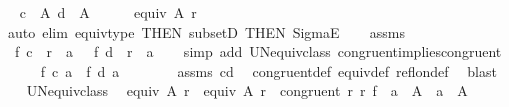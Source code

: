 \begin{isabellebody}
\ \isamarkupfalse%
\ {\isachardoublequoteopen}c\ {\isasymin}\ A{}{\isachardoublequoteclose}\ {\isachardoublequoteopen}d\ {\isasymin}\ A{}{\isachardoublequoteclose}\isanewline
\ \ \ \ \isamarkupfalse%
\ {\isacartoucheopen}equiv\ A{}\ r{}{\isacartoucheclose}\ \isamarkupfalse%
\ {\isacharparenleft}{\kern0pt}auto\ elim{\isacharbang}{\kern0pt}{\isacharcolon}{\kern0pt}\ equiv{\isacharunderscore}{\kern0pt}type\ {\isacharbrackleft}{\kern0pt}THEN\ subsetD{\isacharcomma}{\kern0pt}\ THEN\ SigmaE{}{\isacharbrackright}{\kern0pt}{\isacharparenright}{\kern0pt}\isanewline
\ \ \isamarkupfalse%
\ assms\ \isamarkupfalse%
\ {\isachardoublequoteopen}{\isasymUnion}\ {\isacharparenleft}{\kern0pt}f\ c\ {\isacharbackquote}{\kern0pt}\ r{}\ {\isacharbackquote}{\kern0pt}{\isacharbackquote}{\kern0pt}\ {\isacharbraceleft}{\kern0pt}a{\isacharbraceright}{\kern0pt}{\isacharparenright}{\kern0pt}\ {\isacharequal}{\kern0pt}\ {\isasymUnion}\ {\isacharparenleft}{\kern0pt}f\ d\ {\isacharbackquote}{\kern0pt}\ r{}\ {\isacharbackquote}{\kern0pt}{\isacharbackquote}{\kern0pt}\ {\isacharbraceleft}{\kern0pt}a{\isacharbraceright}{\kern0pt}{\isacharparenright}{\kern0pt}{\isachardoublequoteclose}\isanewline
\ \ \isamarkupfalse%
\ {\isacharparenleft}{\kern0pt}simp\ add{\isacharcolon}{\kern0pt}\ UN{\isacharunderscore}{\kern0pt}equiv{\isacharunderscore}{\kern0pt}class\ congruent{}{\isacharunderscore}{\kern0pt}implies{\isacharunderscore}{\kern0pt}congruent{\isacharparenright}{\kern0pt}\isanewline
\ \ \ \ \isamarkupfalse%
\ {\isachardoublequoteopen}f\ c\ a\ {\isacharequal}{\kern0pt}\ f\ d\ a{\isachardoublequoteclose}\isanewline
\ \ \ \ \ \ \isamarkupfalse%
\ assms\ cd\ \isamarkupfalse%
\ congruent{}{\isacharunderscore}{\kern0pt}def\ equiv{\isacharunderscore}{\kern0pt}def\ refl{\isacharunderscore}{\kern0pt}on{\isacharunderscore}{\kern0pt}def\ \isamarkupfalse%
\ blast\isanewline
\ \ \isamarkupfalse%
\isanewline
{}\isamarkupfalse%
%
\endisatagproof
{\isafoldproof}%
%
\isadelimproof
\isanewline
%
\endisadelimproof
\isanewline
{}\isamarkupfalse%
\ UN{\isacharunderscore}{\kern0pt}equiv{\isacharunderscore}{\kern0pt}class{}{\isacharcolon}{\kern0pt}\isanewline
\ \ {\isachardoublequoteopen}equiv\ A{}\ r{}\ {\isasymLongrightarrow}\ equiv\ A{}\ r{}\ {\isasymLongrightarrow}\ congruent{}\ r{}\ r{}\ f\ {\isasymLongrightarrow}\ a{}\ {\isasymin}\ A{}\ {\isasymLongrightarrow}\ a{}\ {\isasymin}\ A{}\ {\isasymLongrightarrow}\isanewline

\end{isabellebody}
